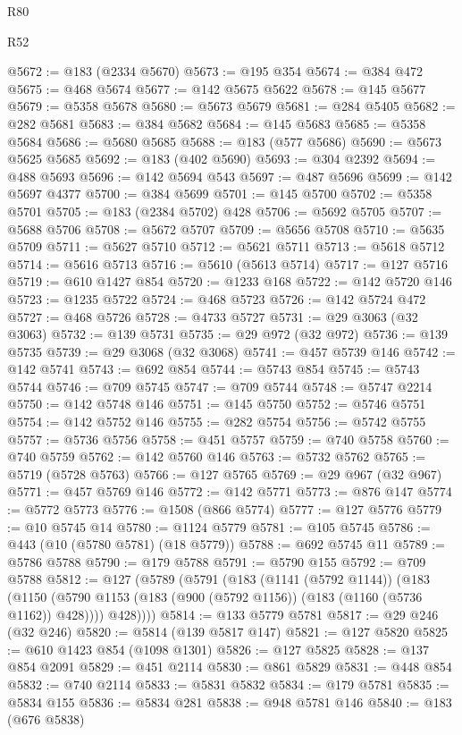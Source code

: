 \begin{lexlean}{R80}
\begin{lexlean}{R52}
\begin{coremodule}
{{{{{{{{{{{{{{{{{{{{{{{{{{{{{{{{{{{{{{{{{{{{{{{{{{{{{{{{{{{{{{{{{{{{{{{{{{{{{{{{{{{{{{{{{{{{{{{{{{{{{{{{{{{{{{{{{{{{{{{{{{{{{{{{{{{{{{{{{{{{{{{{{{{{{{{{{{{{{{{{{{{{{{{{{{{{{{{{{{{{{{{{{{{{{{{{{{{{{{@5672 := @183 (@2334 @5670)
@5673 := @195 @354
@5674 := @384 @472
@5675 := @468 @5674
@5677 := @142 @5675 @5622
@5678 := @145 @5677
@5679 := @5358 @5678
@5680 := @5673 @5679
@5681 := @284 @5405
@5682 := @282 @5681
@5683 := @384 @5682
@5684 := @145 @5683
@5685 := @5358 @5684
@5686 := @5680 @5685
@5688 := @183 (@577 @5686)
@5690 := @5673 @5625 @5685
@5692 := @183 (@402 @5690)
@5693 := @304 @2392
@5694 := @488 @5693
@5696 := @142 @5694 @543
@5697 := @487 @5696
@5699 := @142 @5697 @4377
@5700 := @384 @5699
@5701 := @145 @5700
@5702 := @5358 @5701
@5705 := @183 (@2384 @5702) @428
@5706 := @5692 @5705
@5707 := @5688 @5706
@5708 := @5672 @5707
@5709 := @5656 @5708
@5710 := @5635 @5709
@5711 := @5627 @5710
@5712 := @5621 @5711
@5713 := @5618 @5712
@5714 := @5616 @5713
@5716 := @5610 (@5613 @5714)
@5717 := @127 @5716
@5719 := @610 @1427 @854
@5720 := @1233 @168
@5722 := @142 @5720 @146
@5723 := @1235 @5722
@5724 := @468 @5723
@5726 := @142 @5724 @472
@5727 := @468 @5726
@5728 := @4733 @5727
@5731 := @29 @3063 (@32 @3063)
@5732 := @139 @5731
@5735 := @29 @972 (@32 @972)
@5736 := @139 @5735
@5739 := @29 @3068 (@32 @3068)
@5741 := @457 @5739 @146
@5742 := @142 @5741
@5743 := @692 @854
@5744 := @5743 @854
@5745 := @5743 @5744
@5746 := @709 @5745
@5747 := @709 @5744
@5748 := @5747 @2214
@5750 := @142 @5748 @146
@5751 := @145 @5750
@5752 := @5746 @5751
@5754 := @142 @5752 @146
@5755 := @282 @5754
@5756 := @5742 @5755
@5757 := @5736 @5756
@5758 := @451 @5757
@5759 := @740 @5758
@5760 := @740 @5759
@5762 := @142 @5760 @146
@5763 := @5732 @5762
@5765 := @5719 (@5728 @5763)
@5766 := @127 @5765
@5769 := @29 @967 (@32 @967)
@5771 := @457 @5769 @146
@5772 := @142 @5771
@5773 := @876 @147
@5774 := @5772 @5773
@5776 := @1508 (@866 @5774)
@5777 := @127 @5776
@5779 := @10 @5745 @14
@5780 := @1124 @5779
@5781 := @105 @5745
@5786 := @443 (@10 (@5780 @5781) (@18 @5779))
@5788 := @692 @5745 @11
@5789 := @5786 @5788
@5790 := @179 @5788
@5791 := @5790 @155
@5792 := @709 @5788
@5812 := @127
    (@5789
      (@5791
        (@183
          (@1141 (@5792 @1144))
          (@183
            (@1150 (@5790 @1153 (@183 (@900 (@5792 @1156)) (@183 (@1160 (@5736 @1162)) @428))))
            @428))))
@5814 := @133 @5779 @5781
@5817 := @29 @246 (@32 @246)
@5820 := @5814 (@139 @5817 @147)
@5821 := @127 @5820
@5825 := @610 @1423 @854 (@1098 @1301)
@5826 := @127 @5825
@5828 := @137 @854 @2091
@5829 := @451 @2114
@5830 := @861 @5829
@5831 := @448 @854
@5832 := @740 @2114
@5833 := @5831 @5832
@5834 := @179 @5781
@5835 := @5834 @155
@5836 := @5834 @281
@5838 := @948 @5781 @146
@5840 := @183 (@676 @5838)
}}}}}}}}}}}}}}}}}}}}}}}}}}}}}}}}}}}}}}}}}}}}}}}}}}}}}}}}}}}}}}}}}}}}}}}}}}}}}}}}}}}}}}}}}}}}}}}}}}}}}}}}}}}}}}}}}}}}}}}}}}}}}}}}}}}}}}}}}}}}}}}}}}}}}}}}}}}}}}}}}}}}}}}}}}}}}}}}}}}}}}}}}}}}}}}}}}}}}}
\end{coremodule}
\end{lexlean}
\end{lexlean}
